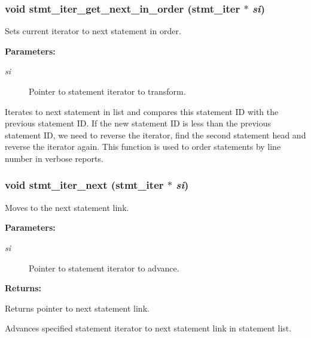 \subsubsection{\setlength{\rightskip}{0pt plus 5cm}void stmt\_\-iter\_\-get\_\-next\_\-in\_\-order ({\bf stmt\_\-iter} $\ast$ {\em si})}\label{iter_8c_a4}


Sets current iterator to next statement in order.

\begin{Desc}
\item[{\bf Parameters: }]\par
\begin{description}
\item[
{\em si}]Pointer to statement iterator to transform.

\end{description}
\end{Desc}
Iterates to next statement in list and compares this statement ID with the previous statement ID. If the new statement ID is less than the previous statement ID, we need to reverse the iterator, find the second statement head and reverse the iterator again. This function is used to order statements by line number in verbose reports. 
\subsubsection{\setlength{\rightskip}{0pt plus 5cm}void stmt\_\-iter\_\-next ({\bf stmt\_\-iter} $\ast$ {\em si})}\label{iter_8c_a1}


Moves to the next statement link.

\begin{Desc}
\item[{\bf Parameters: }]\par
\begin{description}
\item[
{\em si}]Pointer to statement iterator to advance.

\end{description}
\end{Desc}
\begin{Desc}
\item[{\bf Returns: }]\par
Returns pointer to next statement link.

\end{Desc}
Advances specified statement iterator to next statement link in statement list. 
